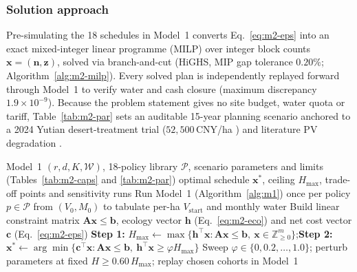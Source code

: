 \subsubsection[Two-Step MILP for Ecological Targets and Cost]{Solution approach}
Pre-simulating the 18 schedules in Model~1 converts Eq.~\eqref{eq:m2-eps} into an exact mixed-integer linear programme (MILP) over integer block counts $\bm x=(\bm n,\bm z)$, solved via branch-and-cut (HiGHS, MIP gap tolerance $0.20\%$; Algorithm~\ref{alg:m2-milp}). Every solved plan is independently replayed forward through Model~1 to verify water and cash closure (maximum discrepancy $1.9\times10^{-9}$). Because the problem statement gives no site budget, water quota or tariff, Table~\ref{tab:m2-par} sets an auditable 15-year planning scenario anchored to a 2024 Yutian desert-treatment trial ($52{,}500$\,CNY/ha \cite{REF20}) and literature PV degradation \cite{EN06}.

\begin{algorithm}[!htb]
\caption{Cohort pre-simulation and two-step $\varepsilon$-constraint MILP}\label{alg:m2-milp}
\begin{algorithmic}[1]
\Require Model~1 $(r,d,K,\mathcal W)$, 18-policy library $\mathcal P$, scenario parameters and limits (Tables~\ref{tab:m2-caps} and \ref{tab:m2-par})
\Ensure optimal schedule $\bm x^*$, ceiling $H_{\max}$, trade-off points and sensitivity runs
\State Run Model~1 (Algorithm~\ref{alg:m1}) once per policy $p\in\mathcal P$ from $(V_0,M_0)$ to tabulate per-ha $V_{\mathrm{start}}$ and monthly water
\State Build linear constraint matrix $\bm A\bm x\le\bm b$, ecology vector $\bm h$ (Eq.~\eqref{eq:m2-eco}) and net cost vector $\bm c$ (Eq.~\eqref{eq:m2-eps})
\State \textbf{Step 1:} $H_{\max}\gets\max\{\bm h^\top\bm x:\bm A\bm x\le\bm b,\ \bm x\in\mathbb Z_{\ge0}^m\}$;\quad \textbf{Step 2:} $\bm x^*\gets\arg\min\{\bm c^\top\bm x:\bm A\bm x\le\bm b,\ \bm h^\top\bm x\ge\varphi H_{\max}\}$
\State Sweep $\varphi\in\{0,0.2,\dots,1.0\}$; perturb parameters at fixed $H\ge0.60\,H_{\max}$; replay chosen cohorts in Model~1
\end{algorithmic}
\end{algorithm}

